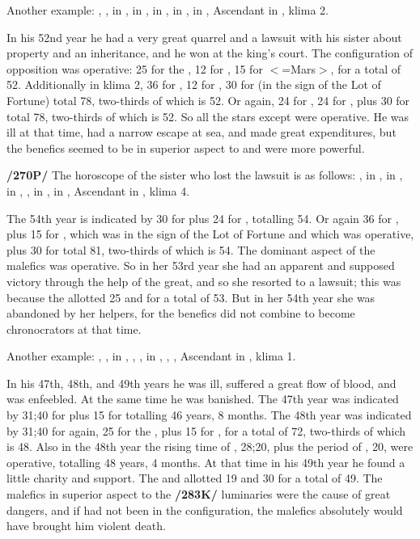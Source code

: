 Another example: \Sun, \Mercury, \Jupiter\xspace in \Scorpio, \Moon\xspace in \Taurus, \Saturn\xspace in \Aquarius, \Mars\xspace in \Virgo, \Venus\xspace in \Libra, Ascendant in \Leo, klima 2. 

In his 52nd year he had a very great quarrel and a lawsuit with his sister about property and an inheritance, and he won at the king’s court. The configuration of opposition was operative: 25 for the \Moon, 12 for \Jupiter, 15 for \Scorpio\xspace $<$=Mars$>$, for a
total of 52. Additionally in klima 2, 36 for \Scorpio, 12 for \Jupiter, 30 for \Saturn\xspace (in the sign of the Lot of Fortune) total 78, two-thirds of which is 52. Or again, 24 for \Taurus, 24 for \Aquarius, plus 30 for \Saturn total 78, two-thirds of which is 52. So all the stars except \Mars\xspace were operative. He was ill at that time, had a narrow escape at sea, and made great expenditures, but the benefics seemed to be in superior aspect to \Saturn\xspace and were more powerful.

\textbf{/270P/} The horoscope of the sister who lost the lawsuit is as follows: \Sun, \Mercury\xspace in \Sagittarius, \Moon\xspace in \Cancer, \Saturn\xspace in \Aquarius, \Jupiter, \Venus\xspace in \Capricorn, \Mars\xspace in \Scorpio, Ascendant in \Gemini,
klima 4. 

The 54th year is indicated by 30 for \Saturn\xspace plus 24 for \Venus, totalling 54. Or again 36 for \Scorpio, plus 15 for \Mars, which was in the sign of the Lot of Fortune and which was operative, plus 30
for \Saturn\xspace total 81, two-thirds of which is 54. The dominant aspect of the malefics was operative. So in her 53rd year she had an apparent and supposed victory through the help of the great, and so she resorted to a lawsuit; this was because the \Moon\xspace allotted 25 and \Capricorn\xspace 28 for a total of 53. But in her 54th year
she was abandoned by her helpers, for the benefics did not combine to become chronocrators at that time.

Another example: \Sun, \Moon, in \Cancer, \Saturn, \Jupiter, \Mars\xspace in \Aries, \Venus, \Mercury, Ascendant in \Gemini, klima 1. 

In his 47th, 48th, and 49th years he was ill, suffered a great flow of blood, and was enfeebled. At the same time he was banished. The 47th year was indicated by 31;40 for \Cancer\xspace plus 15 for
\Mars totalling 46 years, 8 months. The 48th year was indicated by 31;40 for \Cancer\xspace again, 25 for the \Moon, plus 15 for \Mars, for a total of 72, two-thirds of which is 48. Also in the 48th year the rising time of \Gemini, 28;20, plus the period of \Mercury, 20, were operative, totalling 48 years, 4 months. At that time in his 49th year he found a little charity and support. The \Sun\xspace and \Saturn\xspace allotted 19 and 30 for a total of 49. The malefics in superior aspect to the \textbf{/283K/} luminaries were the cause of great dangers, and if \Jupiter\xspace had not been in the configuration, the malefics absolutely would have brought him violent death. 

